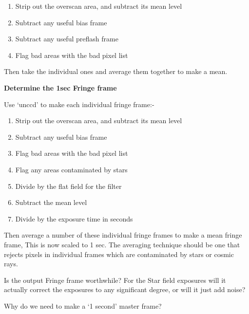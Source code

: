 \begin{small}
{{\begin{enumerate}
\item Strip out the overscan area, and subtract its mean level
\item Subtract any useful bias frame
\item Subtract any useful preflash frame
\item Flag bad areas with the bad pixel list
\end{enumerate}

 Then take the individual ones and average them together to make
 a mean.

{\hspace*{4ex} \bf  Determine the 1sec Fringe frame}

 Use `unccd' to make each individual fringe frame:-

\begin{enumerate}
\item Strip out the overscan area, and subtract its mean level
\item Subtract any useful bias frame
\item Flag bad areas with the bad pixel list
\item Flag any areas contaminated by stars
\item Divide by the flat field for the filter
\item Subtract the mean level
\item Divide by the exposure time in seconds
\end{enumerate}

Then average a number of these individual fringe frames to make a mean
fringe frame, This is now scaled to 1 sec. The averaging technique
should be one that rejects pixels in individual frames which are
contaminated by stars or cosmic rays.

Is the output Fringe frame worthwhile? For the Star field exposures will
it actually correct the exposures to any significant degree, or
will it just add noise?

Why do we need to make a `1 second' master frame?


}}
\end{small}
